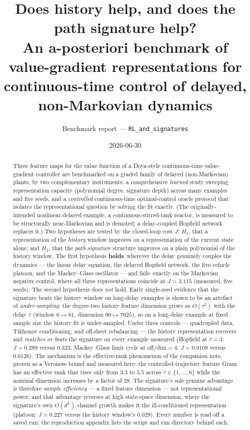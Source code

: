 \documentclass[11pt]{article}
\title{Does history help, and does the path signature help?\\[3pt]
\large An a-posteriori benchmark of value-gradient representations for\\
continuous-time control of delayed, non-Markovian dynamics}
\author{Benchmark report --- \texttt{RL\_and\_signatures}}
\date{2026-06-30}
\renewcommand{\_}{\discretionary{\textunderscore}{}{\textunderscore}}
\theoremstyle{plain}
\theoremstyle{definition}
\newcommand{\holds}{\textcolor{black!80}{\textbf{holds}}}
\newcommand{\failsv}{\textcolor{black!55}{fails}}
\begin{document}
\maketitle

\begin{abstract}
Three feature maps for the value function of a Doya-style continuous-time
value-gradient controller are benchmarked on a graded family of delayed (non-Markovian) plants,
by two complementary instruments: a comprehensive \emph{learned} study sweeping representation
capacity (polynomial degree, signature depth) across many examples and five seeds, and a
\emph{controlled} continuous-time optimal-control oracle protocol that isolates the
representational question by solving the fit exactly. (The originally-intended nonlinear-delayed
example, a continuous-stirred-tank reactor, is measured to be structurally near-Markovian and is
demoted; a delay-coupled Hopfield network replaces it.) Two hypotheses are tested by
the closed-loop cost $J$: $H_1$, that a representation of the \emph{history} window improves
on a representation of the current state alone; and $H_2$, that the \emph{path-signature}
structure improves on a plain polynomial of the history window. The first hypothesis
\holds\ wherever the delay genuinely couples the dynamics --- the linear delay equation, the
delayed Hopfield network, the five-vehicle platoon, and the Mackey--Glass oscillator --- and
\failsv\ exactly on the Markovian negative control, where all three representations coincide
at $J=3.115$ (measured, five seeds). The second hypothesis does \emph{not} hold. Early
single-seed evidence that the signature beats the history window on long-delay examples is shown
to be an artefact of \emph{under-sampling}: the degree-two history feature dimension grows as
$O(\tau^{2})$ with the delay $\tau$ (window $6\mapsto61$, dimension $90\mapsto7625$), so on a
long-delay example at fixed sample size the history fit is under-sampled. Under three controls ---
quadrupled data, Tikhonov conditioning, and off-sheet rebalancing --- the history
representation recovers and \emph{matches or beats} the signature on every example measured
(Hopfield at $\tau=3$: $J=0.289$ versus $0.323$; Mackey--Glass limit cycle at off/dim${}=4$:
$J=0.0108$ versus $0.0126$). The mechanism is the effective-rank phenomenon of the companion
note, proven as a Veronese bound and measured here: the controlled-trajectory feature Gram has
an effective rank that rises only from $3.3$ to $3.5$ across $\tau\in\{1,\dots,6\}$ while the
nominal dimension increases by a factor of $28$. The signature's sole genuine advantage is therefore
\emph{sample efficiency} --- a fixed feature dimension --- not representational power; and that
advantage reverses at high state-space dimension, where the signature's own $O(d^{L})$ channel
growth makes it the ill-conditioned representation (platoon: $J=0.227$ versus the history
window's $0.029$). Every number is read off a saved run; the reproduction appendix lists the
script and run directory behind each.
\end{abstract}
\end{document}
